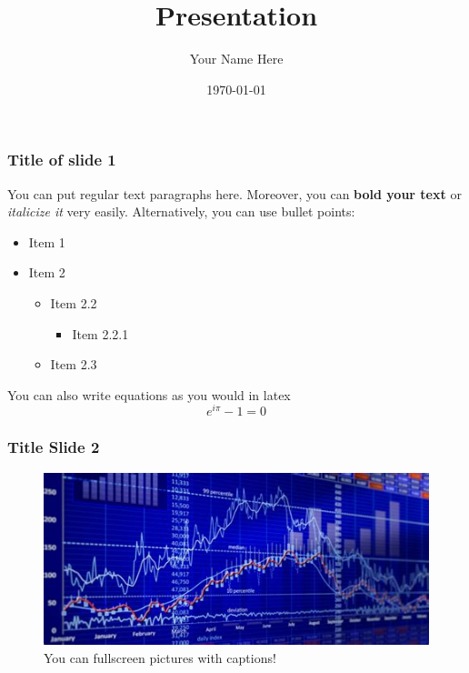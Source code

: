 \documentclass{beamer}
\title{Presentation}
\date{\today}
\author{Your Name Here}
\begin{document}
\frame{\titlepage}

\begin{frame}
    \frametitle{Title of slide 1}

You can put regular text paragraphs here. Moreover, you can \textbf{bold your text} or \emph{italicize it} very easily. Alternatively, you can use bullet points:	\begin{itemize}
		\item Item 1
		\item Item 2
	\begin{itemize}
		\item Item 2.2
	\begin{itemize}
		\item Item 2.2.1
	\end{itemize}
		\item Item 2.3
	\end{itemize}
	\end{itemize}
You can also write equations as you would in latex$$ e^{i \pi} - 1 = 0 $$
\end{frame}


\begin{frame}
    \frametitle{Title Slide 2}


    \begin{figure}
        \centering
        \includegraphics[width=0.9\paperwidth,height=0.7\paperheight,keepaspectratio]{./figs/stock_image.jpg}
        \caption{You can fullscreen pictures with captions!}
    \end{figure}
\end{frame}
\end{document}
